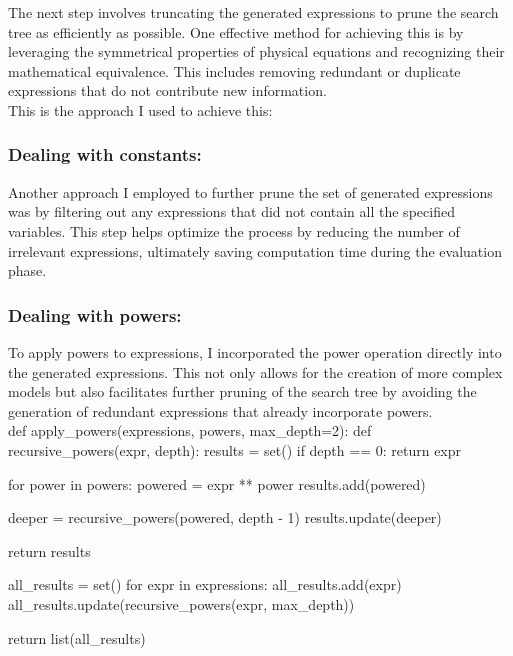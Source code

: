 \documentclass{article}
\begin{document}
The next step involves truncating the generated expressions to prune the search tree as efficiently as possible. One effective method for achieving this is by leveraging the symmetrical properties of physical equations and recognizing their mathematical equivalence. This includes removing redundant or duplicate expressions that do not contribute new information.\\

This is the approach I used to achieve this:\\


\subsubsection{Dealing with constants:}

Another approach I employed to further prune the set of generated expressions was by filtering out any expressions that did not contain all the specified variables. This step helps optimize the process by reducing the number of irrelevant expressions, ultimately saving computation time during the evaluation phase.\\


\subsubsection{Dealing with powers:}

To apply powers to expressions, I incorporated the power operation directly into the generated expressions. This not only allows for the creation of more complex models but also facilitates further pruning of the search tree by avoiding the generation of redundant expressions that already incorporate powers.\\


def apply_powers(expressions, powers, max_depth=2):
    def recursive_powers(expr, depth):
        results = set()
        if depth == 0:
            return {expr}
        
        for power in powers:
            powered = expr ** power
            results.add(powered)

            deeper = recursive_powers(powered, depth - 1)
            results.update(deeper)

        return results

    all_results = set()
    for expr in expressions:
        all_results.add(expr)
        all_results.update(recursive_powers(expr, max_depth))

    return list(all_results)
\end{document}
